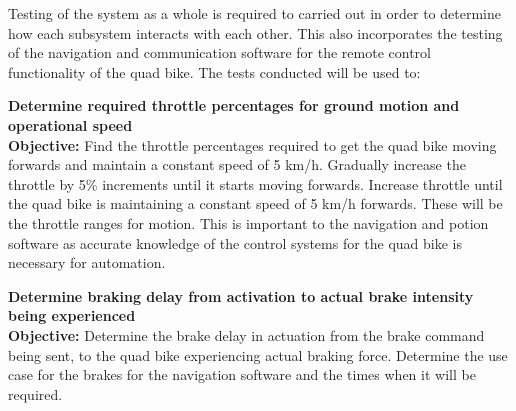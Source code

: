\documentclass[main.tex]{subfiles}
\begin{document}
\begin{appendices}
\begin{qb}
\end{qb}


\medskip\noindent 
Testing of the system as a whole is required to carried out in order to determine how each subsystem interacts with each other. This also incorporates the testing of the navigation and communication software for the remote control functionality of the quad bike. The tests conducted will be used to:


\begin{qb}
\textbf{Determine required throttle percentages for ground motion and operational speed}\\
\textbf{Objective:} Find the throttle percentages required to get the quad bike moving forwards and maintain a constant speed of 5 km/h. Gradually increase the throttle by 5\% increments until it starts moving forwards. Increase throttle until the quad bike is maintaining a constant speed of 5 km/h forwards. These will be the throttle ranges for motion. This is important to the navigation and potion software as accurate knowledge of the control systems for the quad bike is necessary for automation. 

\end{qb}

\begin{qb}
\textbf{Determine braking delay from activation to actual brake intensity being experienced}\\
\textbf{Objective:} Determine the brake delay in actuation from the brake command being sent, to the quad bike experiencing actual braking force. Determine the use case for the brakes for the navigation software and the times when it will be required.


\end{qb}
\end{appendices}
\end{document}
